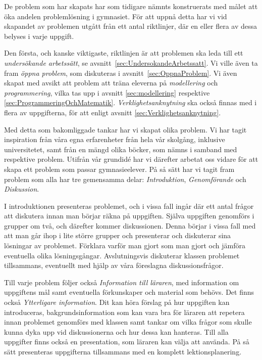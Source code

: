 
    \textcolor{lila}{De problem som har skapats har som tidigare nämnts konstruerats med målet att öka andelen problemlösning i gymnasiet. För att uppnå detta har vi vid skapandet av problemen utgått från ett antal riktlinjer, där en eller flera av dessa belyses i varje uppgift.}
    
    \textcolor{lila}{Den första, och kanske viktigaste, riktlinjen är att problemen ska leda till ett \textsl{undersökande arbetssätt}, se avsnitt~\ref{sec:UndersokandeArbetssatt}. Vi ville även ta fram \textsl{öppna problem}, som diskuteras i avsnitt~\ref{sec:OppnaProblem}. Vi även skapat med avsikt att problem att träna eleverna på \textsl{modellering} och \textsl{programmering}, vilka tas upp i avsnitt \ref{sec:modellering} respektive \ref{sec:ProgrammeringOchMatematik}. \textsl{Verklighetsanknytning} ska också finnas med i flera av uppgifterna, för att enligt avsnitt \ref{sec:Verklighetsanknytning}.}
    
    \textcolor{lila}{Med detta som bakomliggade tankar har vi skapat olika problem. Vi har tagit inspiration från våra egna erfarenheter från hela vår skolgång, inklusive universitetet, samt från en mängd olika böcker, som nämns i samband med respektive problem. Utifrån vår grundidé har vi därefter arbetat oss vidare för att skapa ett problem som passar gymnasieelever. På så sätt har vi tagit fram problem som alla har tre gemensamma delar: \textsl{Introduktion}, \textsl{Genomförande} och \textsl{Diskussion}.}
    
    \textcolor{lila}{I introduktionen presenteras problemet, och i vissa fall ingår där ett antal frågor att diskutera innan man börjar räkna på uppgiften. Själva uppgiften genomförs i grupper om två, och därefter kommer diskussionen. Denna börjar i vissa fall med att man går ihop i lite större grupper och presenterar och diskuterar sina lösningar av problemet. Förklara varför man gjort som man gjort och jämföra eventuella olika lösningsgångar. Avslutningsvis diskuterar klassen problemet tillsammans, eventuellt med hjälp av våra föreslagna diskussionsfrågor.} 
    
    \textcolor{lila}{Till varje problem följer också \textsl{Information till läraren}, med information om uppgiftens mål samt eventuella förkunskaper och material som behövs. Det finns också \textsl{Ytterligare information}. Dit kan höra förslag på hur uppgiften kan introduceras, bakgrundsinformation som kan vara bra för läraren att repetera innan problemet genomförs med klassen samt tankar om vilka frågor som skulle kunna dyka upp vid diskussionerna och hur dessa kan hanteras. Till alla uppgifter finns också en presentation, som läraren kan välja att använda. På så sätt presenteras uppgifterna tillsammans med en komplett lektionsplanering.}
    
